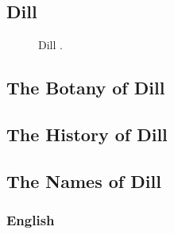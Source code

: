 \subsection{Dill}
\label{sec:dill}



\begin{figure}[!ht]
	\vspace{-4ex}
	\centering
	\hfill
	\caption{Dill \taxon{}.}
	\label{fig:dill_imgs}
\end{figure}

\subsection{The Botany of Dill}

\subsection{The History of Dill}

\subsection{The Names of Dill}

\subsubsection{English}

